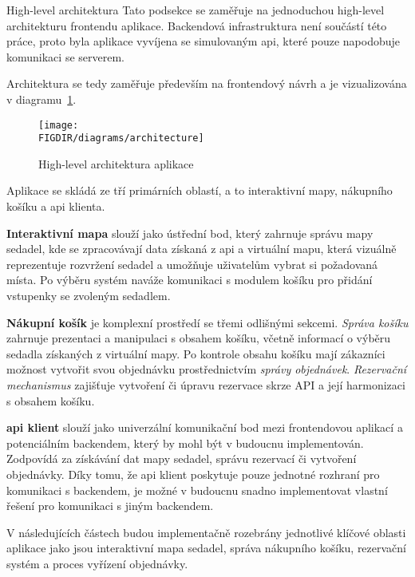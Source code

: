 \begin{subsection}{High-level architektura}
    \label{subsec:implementace-architektura-high-level}
    Tato podsekce se zaměřuje na jednoduchou high-level architekturu frontendu aplikace.
    Backendová infrastruktura není součástí této práce, proto byla aplikace vyvíjena se simulovaným \ac{api}, které pouze napodobuje komunikaci se serverem.

    Architektura se tedy zaměřuje především na frontendový návrh a je vizualizována v diagramu~\ref{fig:implementace-architektura-high-level}.

    \begin{figure}[H]
        \centering
        \caption{High-level architektura aplikace}
        \texttt{[image: \\FIGDIR/diagrams/architecture]}
        \source{}
        \label{fig:implementace-architektura-high-level}
    \end{figure}

    Aplikace se skládá ze tří primárních oblastí, a to interaktivní mapy, nákupního košíku a \ac{api} klienta.

    \textbf{Interaktivní mapa} slouží jako ústřední bod, který zahrnuje správu mapy sedadel, kde se zpracovávají data získaná z \ac{api} a virtuální mapu, která vizuálně reprezentuje rozvržení sedadel a umožňuje uživatelům vybrat si požadovaná místa.
    Po výběru systém naváže komunikaci s modulem košíku pro přidání vstupenky se zvoleným sedadlem.

    \textbf{Nákupní košík} je komplexní prostředí se třemi odlišnými sekcemi.
    \textit{Správa košíku} zahrnuje prezentaci a manipulaci s obsahem košíku, včetně informací o výběru sedadla získaných z virtuální mapy.
    Po kontrole obsahu košíku mají zákazníci možnost vytvořit svou objednávku prostřednictvím \textit{správy objednávek}.
    \textit{Rezervační mechanismus} zajišťuje vytvoření či úpravu rezervace skrze API a její harmonizaci s obsahem košíku.

    \textbf{\ac{api} klient} slouží jako univerzální komunikační bod mezi frontendovou aplikací a potenciálním backendem, který by mohl být v budoucnu implementován.
    Zodpovídá za získávání dat mapy sedadel, správu rezervací či vytvoření objednávky.
    Díky tomu, že \ac{api} klient poskytuje pouze jednotné rozhraní pro komunikaci s backendem, je možné v budoucnu snadno implementovat vlastní řešení pro komunikaci s jiným backendem.

    V následujících částech budou implementačně rozebrány jednotlivé klíčové oblasti aplikace jako jsou interaktivní mapa sedadel, správa nákupního košíku, rezervační systém a proces vyřízení objednávky.
\end{subsection}
